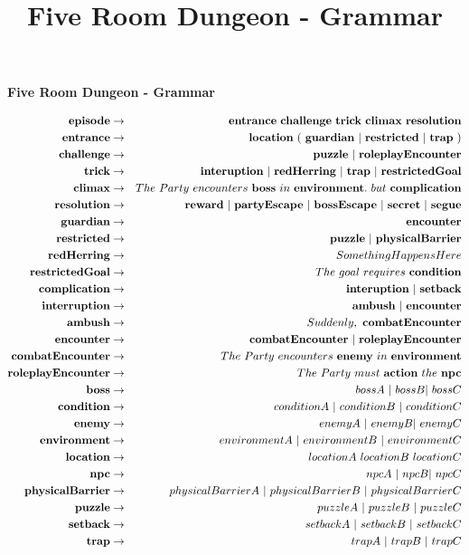 \documentclass{article}
\title{Five Room Dungeon - Grammar}
\date{}
\begin{document}
\newcommand\ra{\ensuremath{\rightarrow}}

\begingroup
\Large\centerline{\textbf{Five Room Dungeon - Grammar}}
\endgroup

\begin{eqnarray*}
{\bf episode} & \ra & {\bf entrance}\ {\bf challenge}\ {\bf trick}\ {\bf climax}\ {\bf resolution}\\
{\bf entrance} & \ra & {\bf location}\ (\ {\bf guardian}\ |\ {\bf restricted}\ |\ {\bf trap}\ )\\\
{\bf challenge} & \ra & {\bf puzzle}\ |\ {\bf roleplayEncounter}\\
{\bf trick} & \ra & {\bf interuption}\ |\ {\bf redHerring}\ |\ {\bf trap}\ |\ {\bf restrictedGoal}\\
{\bf climax} & \ra & The\ Party\ encounters\ {\bf boss}\ in\ {\bf environment}.\ but\ {\bf complication}\\
{\bf resolution} & \ra & {\bf reward}\ |\ {\bf partyEscape}\ |\ {\bf bossEscape}\ |\ {\bf secret}\ |\ {\bf segue}\\
{\bf guardian} & \ra & {\bf encounter}\\
{\bf restricted} & \ra & {\bf puzzle}\ |\ {\bf physicalBarrier}\\
{\bf redHerring} & \ra & SomethingHappensHere\\
{\bf restrictedGoal} & \ra & The\ goal\ requires\ {\bf condition}\\
{\bf complication} & \ra & {\bf interuption}\ |\ {\bf setback}\\
{\bf interruption} & \ra & {\bf ambush}\ |\ {\bf encounter}\\
{\bf ambush} & \ra & Suddenly,\ {\bf combatEncounter}\\
{\bf encounter} & \ra & {\bf combatEncounter}\ |\ {\bf roleplayEncounter}\\
{\bf combatEncounter} & \ra & The\ Party\ encounters\ {\bf enemy}\ in\ {\bf environment}\\
{\bf roleplayEncounter} & \ra & The\ Party\ must\ {\bf action}\ the\ {\bf npc}\\
{\bf boss} & \ra & bossA\ |\ bossB |\ bossC\\
{\bf condition} & \ra & conditionA\ |\ conditionB\ |\ conditionC\\
{\bf enemy} & \ra & enemyA\ |\ enemyB |\ enemyC\\
{\bf environment} & \ra & environmentA\ |\ environmentB\ |\ environmentC\\
{\bf location} & \ra & locationA\ locationB\ locationC\\
{\bf npc} & \ra & npcA\ |\ npcB |\ npcC\\
{\bf physicalBarrier} & \ra & physicalBarrierA\ |\ physicalBarrierB\ |\ physicalBarrierC\\
{\bf puzzle} & \ra & puzzleA\ |\ puzzleB\ |\ puzzleC\\
{\bf setback} & \ra & setbackA\ |\ setbackB\ |\ setbackC\\
{\bf trap} & \ra & trapA\ |\ trapB\ |\ trapC\\
\end{eqnarray*}
\end{document}

